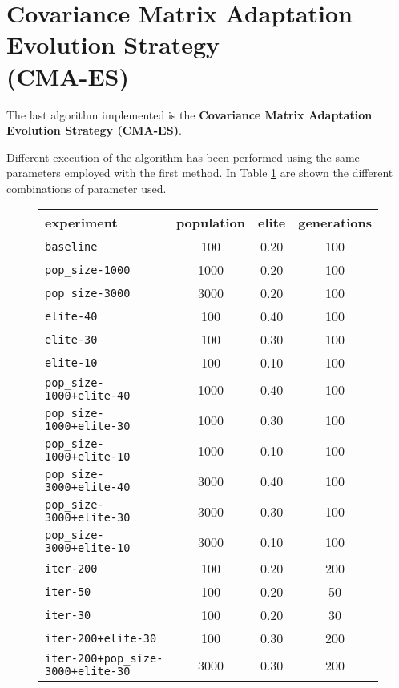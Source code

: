 \section{Covariance Matrix Adaptation Evolution Strategy \\(CMA-ES)}

The last algorithm implemented is the \textbf{Covariance Matrix Adaptation Evolution Strategy (CMA-ES)}. 

Different execution of the algorithm has been performed using the same parameters employed with the first method. In Table \ref{tab:cmaes-param} are shown the different combinations of parameter used.

\begin{figure}[htb]
	\centering
	
	\begin{tabular}{lccc}
		\toprule
		\textbf{experiment} & \textbf{population} & \textbf{elite} &
		\textbf{generations} \\
		\midrule
		\texttt{baseline 						}	 & 100 	& 0.20 	& 100\\
		\texttt{pop\_size-1000 					}	 & 1000 	& 0.20 	& 100\\
		\texttt{pop\_size-3000 					}	 & 3000 	& 0.20 	& 100\\
		\texttt{elite-40 						}	 & 100 	& 0.40 	& 100\\
		\texttt{elite-30 						}	 & 100 	& 0.30 	& 100\\
		\texttt{elite-10 						}	 & 100 	& 0.10 	& 100\\
		\texttt{pop\_size-1000+elite-40 		}	 & 1000 	& 0.40 	& 100\\
		\texttt{pop\_size-1000+elite-30 		}	 & 1000 	& 0.30 	& 100\\
		\texttt{pop\_size-1000+elite-10 		}	 & 1000 	& 0.10 	& 100\\
		\texttt{pop\_size-3000+elite-40 		}	 & 3000 	& 0.40 	& 100\\
		\texttt{pop\_size-3000+elite-30 		}	 & 3000 	& 0.30 	& 100\\
		\texttt{pop\_size-3000+elite-10 		}	 & 3000 	& 0.10 	& 100\\
		\texttt{iter-200 						}	 & 100 	& 0.20 	& 200\\
		\texttt{iter-50 						}	 & 100 	& 0.20 	& 50\\
		\texttt{iter-30 						}	 & 100 	& 0.20 	& 30\\
		\texttt{iter-200+elite-30 				}	 & 100 	& 0.30 	& 200\\
		\texttt{iter-200+pop\_size-3000+elite-30} 	 & 3000 	& 0.30 	& 200\\	
		\bottomrule
	\end{tabular}
	\label{tab:cmaes-param}
\end{figure}

